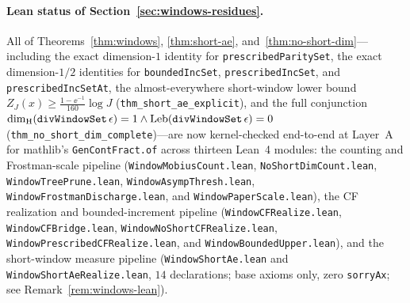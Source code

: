 \paragraph{Lean status of Section~\ref{sec:windows-residues}.}
All of Theorems~\ref{thm:windows}, \ref{thm:short-ae}, and~\ref{thm:no-short-dim}---including the exact dimension-$1$ identity for \texttt{prescribed\allowbreak ParitySet}, the exact dimension-$1/2$ identities for \texttt{bounded\allowbreak IncSet}, \texttt{prescribed\allowbreak IncSet}, and \texttt{prescribed\allowbreak IncSetAt}, the almost-everywhere short-window lower bound $Z_J(x)\ge\frac{1-\ee^{-1}}{160}\log J$ (\texttt{thm\_\allowbreak short\_\allowbreak ae\_\allowbreak explicit}), and the full conjunction $\dim_{\mathrm{H}}(\texttt{div\allowbreak WindowSet}\,\epsilon)=1\wedge\operatorname{Leb}(\texttt{div\allowbreak WindowSet}\,\epsilon)=0$ (\texttt{thm\_\allowbreak no\_\allowbreak short\_\allowbreak dim\_\allowbreak complete})---are now kernel-checked end-to-end at Layer~A for mathlib's \texttt{GenContFract.of} across thirteen Lean~4 modules: the counting and Frostman-scale pipeline (\texttt{Window\allowbreak Mobius\allowbreak Count.lean}, \texttt{No\allowbreak Short\allowbreak Dim\allowbreak Count.lean}, \texttt{Window\allowbreak Tree\allowbreak Prune.lean}, \texttt{Window\allowbreak Asymp\allowbreak Thresh.lean}, \texttt{Window\allowbreak Frostman\allowbreak Discharge.lean}, and \texttt{Window\allowbreak Paper\allowbreak Scale.lean}), the CF realization and bounded-increment pipeline (\texttt{Window\allowbreak CF\allowbreak Realize.lean}, \texttt{Window\allowbreak CF\allowbreak Bridge.lean}, \texttt{Window\allowbreak No\allowbreak Short\allowbreak CF\allowbreak Realize.lean}, \texttt{Window\allowbreak Prescribed\allowbreak CF\allowbreak Realize.lean}, and \texttt{Window\allowbreak Bounded\allowbreak Upper.lean}), and the short-window measure pipeline (\texttt{Window\allowbreak Short\allowbreak Ae.lean} and \texttt{Window\allowbreak Short\allowbreak Ae\allowbreak Realize.lean}, $14$ declarations; base axioms only, zero \texttt{sorryAx}; see Remark~\ref{rem:windows-lean}).
